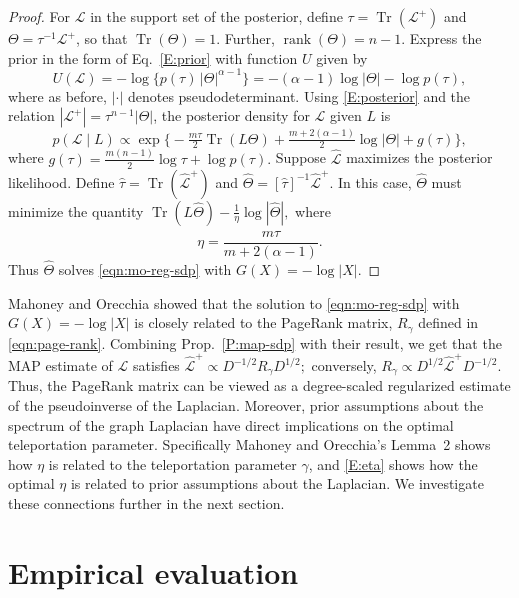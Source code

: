 \documentclass[12pt]{article}
\DeclareMathOperator*{\Tr}{Tr}
\DeclareMathOperator*{\rank}{rank}
\theoremstyle{plain}
\begin{document}
\begin{proof}
For $\mathcal{L}$ in the support set of the posterior,
define $\tau = \Tr(\mathcal{L}^+)$ and $\Theta  = \tau^{-1}
\mathcal{L}^+$, so that $\Tr(\Theta) = 1$.  Further, $\rank(\Theta) = n - 1$.
Express the prior in the form of Eq.~\eqref{E:prior} with function
$U$ given by
\[
  U(\mathcal{L})
    = -\log \{ p(\tau) \, |\Theta|^{\alpha - 1} \}
    = -(\alpha - 1) \log |\Theta| - \log p(\tau),
\]
where as before, $|\cdot|$ denotes pseudodeterminant.  Using
\eqref{E:posterior} and the relation
$|\mathcal{L}^+| = \tau^{n-1} |\Theta|$, the posterior
density for $\mathcal{L}$ given $L$ is
\[
  p(\mathcal{L} \mid L)
    \propto
      \exp\Big\{
        -\tfrac{m \tau}{2} \Tr(L \Theta)
        +\tfrac{m + 2(\alpha - 1)}{2} \log | \Theta |
        + g(\tau)\Big\},
\]
where
\(
  g(\tau)
    = \tfrac{m (n-1)}{2} \log \tau
        + \log p(\tau).
\)
Suppose $\mathcal{\hat L}$ maximizes the
posterior likelihood.  Define $\hat \tau = \Tr(\mathcal{\hat L}^+)$
and $\hat \Theta = [\hat \tau]^{-1} \mathcal{\hat L}^{+}$.
In this case, $\hat \Theta$ must minimize the quantity
\(
  \Tr(L \hat \Theta) - \tfrac{1}{\eta} \log |\hat \Theta|,
\)
where
\begin{equation}\label{E:eta}
  \eta
    = \frac{m \hat \tau}{m + 2(\alpha - 1)}.
\end{equation}
Thus $\hat \Theta$ solves \eqref{eqn:mo-reg-sdp} with $G(X) = - \log |X|$.
\end{proof}

Mahoney and Orecchia showed that the solution to
\eqref{eqn:mo-reg-sdp} with $G(X) = - \log |X|$ is closely related to
the PageRank matrix, $R_\gamma$ defined in \eqref{eqn:page-rank}.
Combining Prop.~\ref{P:map-sdp} with their result, we get that the MAP
estimate of $\mathcal{L}$ satisfies
\( \mathcal{\hat L}^+ \propto D^{-1/2} R_\gamma D^{1/2}; \)
conversely,
\(
  R_\gamma
    \propto
      D^{1/2} \mathcal{\hat L}^+ D^{-1/2}.
\)
Thus, the PageRank matrix can be viewed as a degree-scaled regularized
estimate of the pseudoinverse of the Laplacian.  Moreover, prior
assumptions about the spectrum of the graph Laplacian have direct
implications on the optimal teleportation parameter.  Specifically
Mahoney and Orecchia's Lemma~2 shows how $\eta$ is related to the
teleportation parameter $\gamma$, and \eqref{E:eta} shows how the
optimal $\eta$ is related to prior assumptions about the Laplacian.
We investigate these connections further in the next section.


\section{Empirical evaluation}
\label{sxn:empirical}
\end{document}
